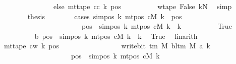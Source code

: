 \begin{isabellebody}
\ \ \ \ \ \ \ \ \ \ \ \ \ \ \ else\ mt{\isacharunderscore}{\kern0pt}tape\ c{\isacharunderscore}{\kern0pt}c\ k\ pos{\isacharparenright}{\kern0pt}{\isachardoublequoteclose}\isanewline
\ \ \ \ \ \ \ \ \isamarkupfalse%
\ w{\isacharunderscore}{\kern0pt}tape\ False\ kN\ \isamarkupfalse%
\ simp\isanewline
\ \ \ \ \ \ \isamarkupfalse%
\ {\isacharquery}{\kern0pt}thesis\isanewline
\ \ \ \ \ \ \isamarkupfalse%
\ {\isacharparenleft}{\kern0pt}cases\ {\isachardoublequoteopen}sim{\isacharunderscore}{\kern0pt}pos\ {\isacharquery}{\kern0pt}k\ {\isacharparenleft}{\kern0pt}mt{\isacharunderscore}{\kern0pt}pos\ cM\ k{\isacharparenright}{\kern0pt}\ {\isasymle}\ pos\isanewline
\ \ \ \ \ \ \ \ \ \ \ \ \ \ \ \ \ \ \ \ \ \ {\isasymand}\ pos\ {\isacharless}{\kern0pt}\ sim{\isacharunderscore}{\kern0pt}pos\ {\isacharquery}{\kern0pt}k\ {\isacharparenleft}{\kern0pt}mt{\isacharunderscore}{\kern0pt}pos\ cM\ k{\isacharparenright}{\kern0pt}\ {\isacharplus}{\kern0pt}\ {\isacharquery}{\kern0pt}k{\isachardoublequoteclose}{\isacharparenright}{\kern0pt}\isanewline
\ \ \ \ \ \ \ \ \isamarkupfalse%
\ True\isanewline
\ \ \ \ \ \ \ \ \isamarkupfalse%
\ b{\isacharcolon}{\kern0pt}\ {\isachardoublequoteopen}pos\ {\isacharminus}{\kern0pt}\ sim{\isacharunderscore}{\kern0pt}pos\ {\isacharquery}{\kern0pt}k\ {\isacharparenleft}{\kern0pt}mt{\isacharunderscore}{\kern0pt}pos\ cM\ k{\isacharparenright}{\kern0pt}\ {\isacharless}{\kern0pt}\ {\isacharquery}{\kern0pt}k{\isachardoublequoteclose}\ \isamarkupfalse%
\ True\ \isamarkupfalse%
\ linarith\isanewline
\ \ \ \ \ \ \ \ \isamarkupfalse%
\ {\isachardoublequoteopen}mt{\isacharunderscore}{\kern0pt}tape\ c{\isacharunderscore}{\kern0pt}w\ k\ pos\isanewline
\ \ \ \ \ \ \ \ \ \ \ \ \ \ \ \ {\isacharequal}{\kern0pt}\ write{\isacharunderscore}{\kern0pt}bit\ {\isacharparenleft}{\kern0pt}{\isasymGamma}{\isacharunderscore}{\kern0pt}tm\ M{\isacharparenright}{\kern0pt}\ {\isacharparenleft}{\kern0pt}bl{\isacharunderscore}{\kern0pt}tm\ M{\isacharparenright}{\kern0pt}\ {\isacharparenleft}{\kern0pt}a{\isacharprime}{\kern0pt}\ k{\isacharparenright}{\kern0pt}\isanewline
\ \ \ \ \ \ \ \ \ \ \ \ \ \ \ \ \ \ \ \ {\isacharparenleft}{\kern0pt}pos\ {\isacharminus}{\kern0pt}\ sim{\isacharunderscore}{\kern0pt}pos\ {\isacharquery}{\kern0pt}k\ {\isacharparenleft}{\kern0pt}mt{\isacharunderscore}{\kern0pt}pos\ cM\ k{\isacharparenright}{\kern0pt}{\isacharparenright}{\kern0pt}{\isachardoublequoteclose}\isanewline

\end{isabellebody}

